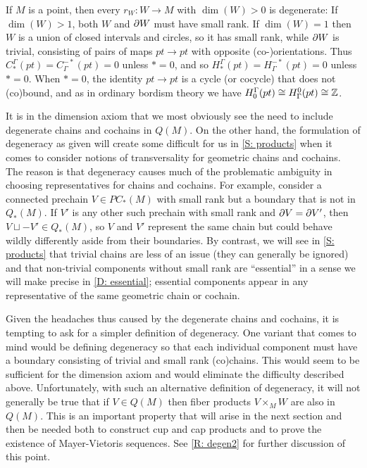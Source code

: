 \begin{example}\label{E: dimension}
If $M$ is a point, then every $r_W: W\to M$ with $\dim(W)>0$ is degenerate: If $\dim(W)>1$, both $W$ and $\partial W$ must have small rank. If $\dim(W)=1$ then $W$ is a union of closed intervals and circles, so it has small rank, while $\partial W$ is trivial, consisting of pairs of maps $pt\to pt$ with opposite (co-)orientations. Thus $C_*^\Gamma(pt)=C^{-*}_\Gamma(pt)=0$ unless $*=0$, and so $H_*^\Gamma(pt)=H^{-*}_\Gamma(pt)=0$ unless $*=0$. When $*=0$, the identity $pt\to pt$ is a cycle (or cocycle) that does not (co)bound, and as in ordinary bordism theory we have $H_0^\Gamma(pt)\cong H^0_\Gamma(pt)\cong \mathbb{Z}$.
\end{example}

\begin{remark}\label{R: degen1}
It is in the dimension axiom that we most obviously see the need to include degenerate chains and cochains in $Q(M)$. On the other hand, the formulation of degeneracy as given will create some difficult for us in \cref{S: products} when it comes to consider notions of transversality for geometric chains and cochains. The reason is that degeneracy causes much of the problematic ambiguity in choosing representatives for chains and cochains. For example, consider a connected prechain $V\in PC_*(M)$ with small rank but a boundary that is not in $Q_*(M)$. If $V'$ is any other such prechain with small rank and $\partial V=\partial V'$, then $V\sqcup -V'\in Q_*(M)$, so $V$ and $V'$ represent the same chain but could behave wildly differently aside from their boundaries. By contrast, we will see in \cref{S: products} that trivial chains are less of an issue (they can generally be ignored) and that non-trivial components without small rank are ``essential'' in a sense we will make precise in \cref{D: essential}; essential components appear in any representative of the same geometric chain or cochain.

Given the headaches thus caused by the degenerate chains and cochains, it is tempting to ask for a simpler definition of degeneracy. One variant that comes to mind would be defining degeneracy so that each individual component must have a boundary consisting of trivial and small rank (co)chains. This would seem to be sufficient for the dimension axiom and would eliminate the difficulty described above. Unfortunately, with such an alternative definition of degeneracy, it will not generally be true that if $V\in Q(M)$ then fiber products $V\times_M W$ are also in $Q(M)$. This is an important property that will arise in the next section and then be needed both to construct cup and cap products and to prove the existence of Mayer-Vietoris sequences. See \cref{R: degen2} for further discussion of this point.
\end{remark}


